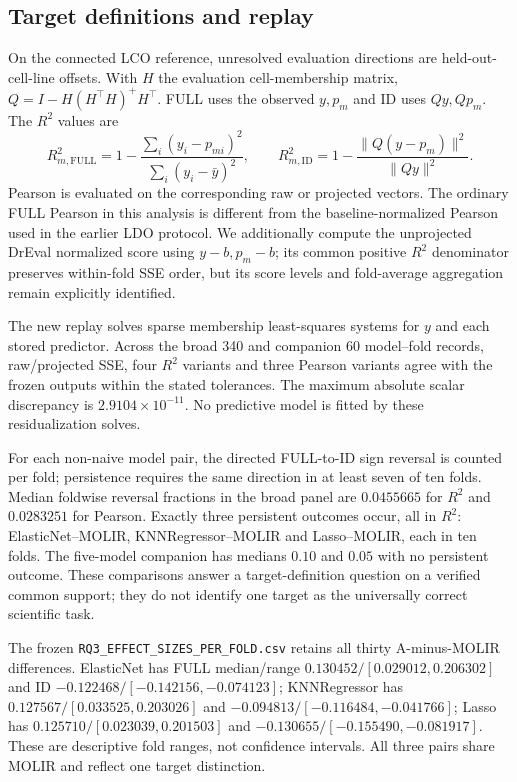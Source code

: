 \subsection{Target definitions and replay}
On the connected LCO reference, unresolved evaluation directions are held-out-cell-line offsets. With $H$ the evaluation cell-membership matrix, $Q=I-H(H^\top H)^+H^\top$. FULL uses the observed $y,p_m$ and ID uses $Qy,Qp_m$. The $R^2$ values are
\[
R^2_{m,\mathrm{FULL}}=1-\frac{\sum_i(y_i-p_{mi})^2}{\sum_i(y_i-\bar y)^2},\qquad
R^2_{m,\mathrm{ID}}=1-\frac{\|Q(y-p_m)\|^2}{\|Qy\|^2}.
\]
Pearson is evaluated on the corresponding raw or projected vectors. The ordinary FULL Pearson in this analysis is different from the baseline-normalized Pearson used in the earlier LDO protocol. We additionally compute the unprojected DrEval normalized score using $y-b,p_m-b$; its common positive $R^2$ denominator preserves within-fold SSE order, but its score levels and fold-average aggregation remain explicitly identified.

The new replay solves sparse membership least-squares systems for $y$ and each stored predictor. Across the broad 340 and companion 60 model--fold records, raw/projected SSE, four $R^2$ variants and three Pearson variants agree with the frozen outputs within the stated tolerances. The maximum absolute scalar discrepancy is $2.9104\times10^{-11}$. No predictive model is fitted by these residualization solves.

For each non-naive model pair, the directed FULL-to-ID sign reversal is counted per fold; persistence requires the same direction in at least seven of ten folds. Median foldwise reversal fractions in the broad panel are $0.0455665$ for $R^2$ and $0.0283251$ for Pearson. Exactly three persistent outcomes occur, all in $R^2$: ElasticNet--MOLIR, KNNRegressor--MOLIR and Lasso--MOLIR, each in ten folds. The five-model companion has medians $0.10$ and $0.05$ with no persistent outcome. These comparisons answer a target-definition question on a verified common support; they do not identify one target as the universally correct scientific task.

The frozen \nolinkurl{RQ3_EFFECT_SIZES_PER_FOLD.csv} retains all thirty A-minus-MOLIR differences. ElasticNet has FULL median/range $0.130452/[0.029012,0.206302]$ and ID $-0.122468/[-0.142156,-0.074123]$; KNNRegressor has $0.127567/[0.033525,0.203026]$ and $-0.094813/[-0.116484,-0.041766]$; Lasso has $0.125710/[0.023039,0.201503]$ and $-0.130655/[-0.155490,-0.081917]$. These are descriptive fold ranges, not confidence intervals. All three pairs share MOLIR and reflect one target distinction.

